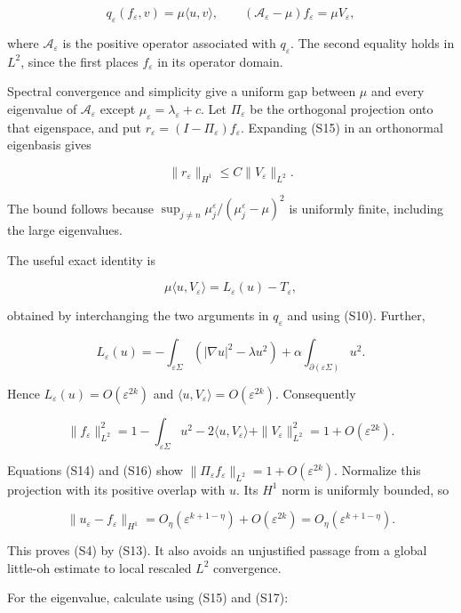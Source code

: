 \documentclass[11pt]{article}
\begin{document}
\[
 q_\varepsilon(f_\varepsilon,v)=\mu\langle u,v\rangle,
 \qquad
 (\mathcal A_\varepsilon-\mu)f_\varepsilon=\mu V_\varepsilon,
 \tag{S15}
\]

where \(\mathcal A_\varepsilon\) is the positive operator associated
with \(q_\varepsilon\). The second equality holds in \(L^2\), since the
first places \(f_\varepsilon\) in its operator domain.

Spectral convergence and simplicity give a uniform gap between \(\mu\)
and every eigenvalue of \(\mathcal A_\varepsilon\) except
\(\mu_\varepsilon=\lambda_\varepsilon+c\). Let \(\Pi_\varepsilon\) be
the orthogonal projection onto that eigenspace, and put
\(r_\varepsilon=(I-\Pi_\varepsilon)f_\varepsilon\). Expanding (S15) in
an orthonormal eigenbasis gives

\[
 \|r_\varepsilon\|_{H^1}
 \le C\|V_\varepsilon\|_{L^2}.
 \tag{S16}
\]

The bound follows because
\(\sup_{j\ne n}\mu_j^\varepsilon/(\mu_j^\varepsilon-\mu)^2\) is
uniformly finite, including the large eigenvalues.

The useful exact identity is

\[
 \mu\langle u,V_\varepsilon\rangle
 =L_\varepsilon(u)-T_\varepsilon,
 \tag{S17}
\]

obtained by interchanging the two arguments in \(q_\varepsilon\) and
using (S10). Further,

\[
 L_\varepsilon(u)=
 -\int_{\varepsilon\Sigma}(|\nabla u|^2-\lambda u^2)
 +\alpha\int_{\partial(\varepsilon\Sigma)}u^2.
 \tag{S18}
\]

Hence \(L_\varepsilon(u)=O(\varepsilon^{2k})\) and
\(\langle u,V_\varepsilon\rangle=O(\varepsilon^{2k})\). Consequently

\[
 \|f_\varepsilon\|_{L^2}^2
 =1-\int_{\varepsilon\Sigma}u^2
    -2\langle u,V_\varepsilon\rangle+\|V_\varepsilon\|_{L^2}^2
 =1+O(\varepsilon^{2k}).
\]

Equations (S14) and (S16) show
\(\|\Pi_\varepsilon f_\varepsilon\|_{L^2}=1+O(\varepsilon^{2k})\).
Normalize this projection with its positive overlap with \(u\). Its
\(H^1\) norm is uniformly bounded, so

\[
 \|u_\varepsilon-f_\varepsilon\|_{H^1}
 =O_\eta(\varepsilon^{k+1-\eta})+O(\varepsilon^{2k})
 =O_\eta(\varepsilon^{k+1-\eta}).
 \tag{S19}
\]

This proves (S4) by (S13). It also avoids an unjustified passage from a
global little-oh estimate to local rescaled \(L^2\) convergence.

For the eigenvalue, calculate using (S15) and (S17):
\end{document}
